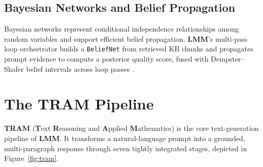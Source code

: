 \documentclass[11pt,a4paper]{article}
\newcommand{\lmm}{\texorpdfstring{%
  \textbf{\color{lmmAccent}LMM}}{LMM}}
\newcommand{\tram}{\texorpdfstring{%
  \textbf{\color{lmmTeal}TRAM}}{TRAM}}
\begin{document}
\subsection{Bayesian Networks and Belief Propagation}

Bayesian networks \citep{pearl1988probabilistic} represent conditional independence relationships
among random variables and support efficient belief propagation. \lmm{}'s multi-pass loop
orchestrator builds a \texttt{BeliefNet} from retrieved KB chunks and propagates prompt evidence
to compute a posterior quality score, fused with Dempster--Shafer belief intervals across
loop passes \citep{shafer1976mathematical}.

\section{The \tram{} Pipeline}
\label{sec:tram}

\tram{} (\textbf{T}ext \textbf{R}easoning and \textbf{A}pplied \textbf{M}athematics) is the core
text-generation pipeline of \lmm{}. It transforms a natural-language prompt into a grounded,
multi-paragraph response through seven tightly integrated stages, depicted in
Figure~\ref{fig:tram}.
\end{document}
